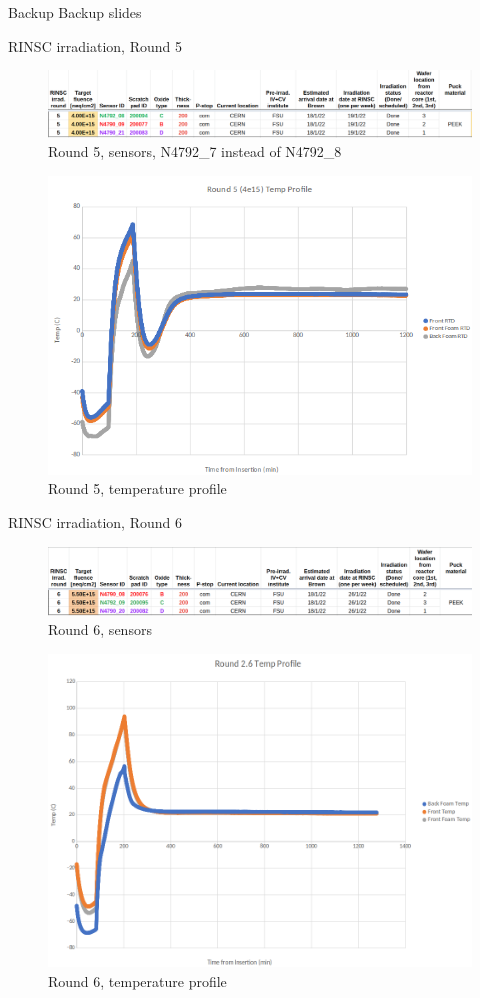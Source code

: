 \documentclass{beamer}
\begin{document}
\begin{frame}{Backup}
	\center
	\huge
	Backup slides
\end{frame}




\begin{frame}{RINSC irradiation, Round 5}
    \begin{figure}
        \includegraphics[width=.7\textwidth]{plots/Round_5_sensors.png}
        \caption{Round 5, sensors, N4792\_7 instead of N4792\_8}
    \end{figure}
    \begin{figure}
      \includegraphics[width=.5\textwidth]{plots/Round5_temp_profile.png}
      \caption{Round 5, temperature profile}
    \end{figure}
\end{frame}

\begin{frame}{RINSC irradiation, Round 6}
    \begin{figure}
        \includegraphics[width=.7\textwidth]{plots/Round_6_sensors.png}
        \caption{Round 6, sensors}
    \end{figure}
    \begin{figure}
      \includegraphics[width=.5\textwidth]{plots/Round6_temp_profile.png}
      \caption{Round 6, temperature profile}
    \end{figure}
\end{frame}
\end{document}
